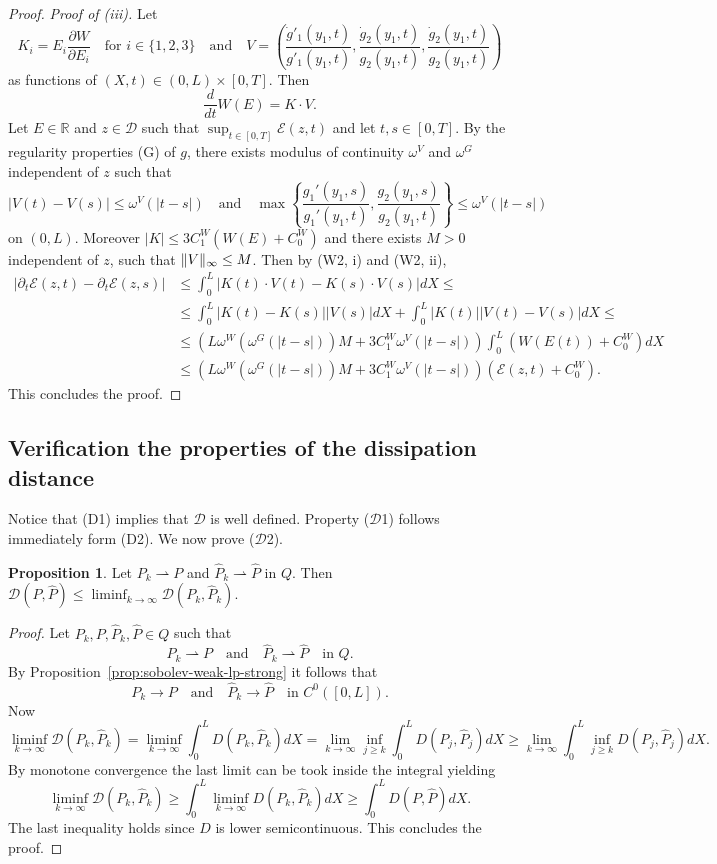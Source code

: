 \documentclass[a4paper,10pt,oneside]{amsbook}
\numberwithin{section}{chapter}
\numberwithin{equation}{chapter}
\theoremstyle{definition}
\newtheorem{prop}{Proposition}[chapter]
\DeclarePairedDelimiter{\norm}{\lVert}{\rVert}
\newcommand{\dind}[2]{\frac{\partial #1}{\partial #2}}
\begin{document}
\begin{proof}
\emph{Proof of (iii).} Let
\[
K_i=E_i\dind{W}{E_i}\quad\text{for $i\in\{1,2,3\}$}\quad\text{and}\quad V=\left(\frac{\dot{g}'_1(y_1,t)}{g'_1(y_1,t)},\frac{\dot{g}_2(y_1,t)}{g_2(y_1,t)},\frac{\dot{g}_2(y_1,t)}{g_2(y_1,t)}\right)
\]
as functions of $(X,t)\in(0,L)\times[0,T]$. Then
\[
\frac{d}{dt}W(E)=K\cdot V.
\]
Let $E\in\mathbb{R}$ and $z\in\mathscr{D}$ such that $\sup_{t\in[0,T]}\mathcal{E}(z,t)$ and let $t,s\in[0,T]$. By the regularity properties (G) of $g$, there exists modulus of continuity $\omega^V$ and $\omega^G$ independent of $z$ such that
\[
|V(t)-V(s)|\le\omega^V(|t-s|)\quad\text{and}\quad\max\left\{\frac{g_1'(y_1,s)}{g_1'(y_1,t)},\frac{g_2(y_1,s)}{g_2(y_1,t)}\right\}\le\omega^V(|t-s|)
\]
on $(0,L)$. Moreover $|K|\le 3C_1^W(W(E)+C_0^W)$ and there exists $M>0$ independent of $z$, such that $\norm{V}_\infty\le M$. Then by (W2, i) and (W2, ii),
\[
\begin{split}
|\partial_t\mathcal{E}(z,t)-\partial_t\mathcal{E}(z,s)|&\le\int_0^L|K(t)\cdot V(t)-K(s)\cdot V(s)|dX\le\\
&\le\int_0^L|K(t)-K(s)||V(s)|dX+\int_0^L|K(t)||V(t)-V(s)|dX\le\\
&\le \left(L\omega^W(\omega^G(|t-s|))M+3C_1^W\omega^V(|t-s|)\right)\int_0^L(W(E(t))+C_0^W)dX\\
&\le\left(L\omega^W(\omega^G(|t-s|))M+3C_1^W\omega^V(|t-s|)\right)(\mathcal{E}(z,t)+C_0^W).
\end{split}
\]
This concludes the proof.
\end{proof}

\subsection{Verification the properties of the dissipation distance}

Notice that (D1) implies that $\mathcal{D}$ is well defined. Property ($\mathcal{D}$1) follows immediately form (D2). We now prove ($\mathcal{D}$2).
\begin{prop}
Let $P_k\rightharpoonup P$ and $\hat{P}_k\rightharpoonup\hat{P}$ in $Q$. Then $\mathcal{D}(P,\hat{P})\le\liminf_{k\to\infty}\mathcal{D}(P_k,\hat{P}_k)$.
\end{prop}
\begin{proof}
Let $P_k,P,\hat{P}_k,\hat{P}\in Q$ such that
\[
P_k\rightharpoonup P\quad\text{and}\quad\hat{P}_k\rightharpoonup\hat{P}\quad\text{in $Q$.}
\]
By Proposition~\ref{prop:sobolev-weak-lp-strong} it follows that
\[
P_k\to P\quad\text{and}\quad\hat{P}_k\to\hat{P}\quad\text{in $C^0([0,L])$.}
\]
Now
\[
\liminf_{k\to\infty}\mathcal{D}(P_k,\hat{P}_k)=\liminf_{k\to\infty}\int_0^LD(P_k,\hat{P}_k)dX=\lim_{k\to\infty}\inf_{j\ge k}\int_0^LD(P_j,\hat{P}_j)dX\ge\lim_{k\to\infty}\int_0^L\inf_{j\ge k}D(P_j,\hat{P}_j)dX.
\]
By monotone convergence the last limit can be took inside the integral yielding
\[
\liminf_{k\to\infty}\mathcal{D}(P_k,\hat{P}_k)\ge\int_0^L\liminf_{k\to\infty}D(P_k,\hat{P}_k)dX\ge\int_0^L D(P,\hat{P})dX.
\]
The last inequality holds since $D$ is lower semicontinuous. This concludes the proof.
\end{proof}
\end{document}
